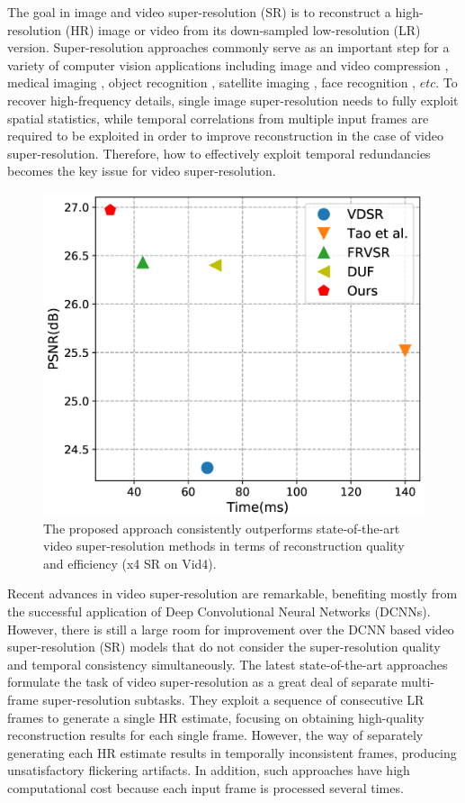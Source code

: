 \documentclass[letterpaper]{article} %
\begin{document}
The goal in image and video super-resolution (SR) is to reconstruct a high-resolution (HR) image or video from its down-sampled low-resolution (LR) version. Super-resolution approaches commonly serve as an important step for a variety of computer vision applications including image and video compression \cite{Li2017An,Kappeler2016Super}, medical imaging \cite{Yang2012Coupled}, object recognition \cite{Yang2018Long}, satellite imaging \cite{Demirel2011Discrete}, face recognition \cite{Gunturk2003Eigenface}, $etc$. To recover high-frequency details, single image super-resolution needs to fully exploit spatial statistics, while temporal correlations from multiple input frames are required to be exploited in order to improve reconstruction in the case of video super-resolution. Therefore, how to effectively exploit temporal redundancies becomes the key issue for video super-resolution.


\begin{figure}[t]
\centering
\includegraphics[width=7 cm]{Fig0.png}
\caption{The proposed approach consistently outperforms state-of-the-art video super-resolution methods in terms of reconstruction quality and efficiency (x4 SR on Vid4).}
\label{PSNRvsTime}
\end{figure}


Recent advances in video super-resolution are remarkable, benefiting mostly from the successful application of Deep Convolutional Neural Networks (DCNNs). However, there is still a large room for improvement over the DCNN based video super-resolution (SR) models that do not consider the super-resolution quality and temporal consistency simultaneously. The latest state-of-the-art approaches \cite{Dong2016Accelerating,VDSR2016cvpr,BayesSR2011cvpr,DESR2015iccv,VSRNet2016TCT,VESPCN2017cvpr,Tao2017iccv,DUF16L2018cvpr} formulate the task of video super-resolution as a great deal of separate multi-frame super-resolution subtasks. They exploit a sequence of consecutive LR frames to generate a single HR estimate, focusing on obtaining high-quality reconstruction results for each single frame. However, the way of separately generating each HR estimate results in temporally inconsistent frames, producing unsatisfactory flickering artifacts. In addition, such approaches have high computational cost because each input frame is processed several times.
\end{document}
